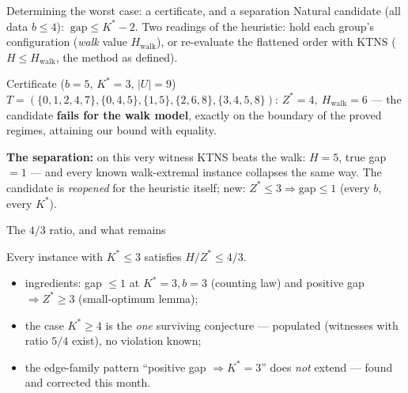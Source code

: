 \documentclass[10pt]{beamer}
\newcommand{\U}{U}\newcommand{\Kst}{K^{\ast}}\newcommand{\Zst}{Z^{\ast}}
\begin{document}
\begin{frame}{Determining the worst case: a certificate, and a separation}
Natural candidate (all data $b\le4$): $\ \mathrm{gap}\le\Kst-2$. Two readings
of the heuristic: hold each group's configuration (\emph{walk} value
$H_{\mathrm{walk}}$), or re-evaluate the flattened order with KTNS
($H\le H_{\mathrm{walk}}$, the method as defined).
\pause
\begin{alertblock}{Certificate ($b=5$, $\Kst=3$, $|\U|=9$)}
$T=(\{0,1,2,4,7\},\{0,4,5\},\{1,5\},\{2,6,8\},\{3,4,5,8\})$:\quad
$\Zst=4,\ H_{\mathrm{walk}}=6$ --- the candidate \textbf{fails for the walk
model}, exactly on the boundary of the proved regimes, attaining our bound
with equality.
\end{alertblock}
\pause
\textbf{The separation:} on this very witness KTNS beats the walk: $H=5$,
true gap $=1$ --- and every known walk-extremal instance collapses the same
way. The candidate is \emph{reopened} for the heuristic itself; new:
$\Zst\le3\Rightarrow\mathrm{gap}\le1$ (every $b$, every $\Kst$).
\end{frame}

\begin{frame}{The $4/3$ ratio, and what remains}
\begin{theorem}[$b=3$]
Every instance with $\Kst\le3$ satisfies $H/\Zst\le 4/3$.
\end{theorem}
\begin{itemize}
  \item ingredients: gap $\le1$ at $\Kst=3,b=3$ (counting law) and
        positive gap $\Rightarrow \Zst\ge3$ (small-optimum lemma);
  \item the case $\Kst\ge4$ is the \emph{one} surviving conjecture ---
        populated (witnesses with ratio $5/4$ exist), no violation known;
  \item the edge-family pattern ``positive gap $\Rightarrow\Kst=3$'' does
        \emph{not} extend --- found and corrected this month.
\end{itemize}
\end{frame}
\end{document}
